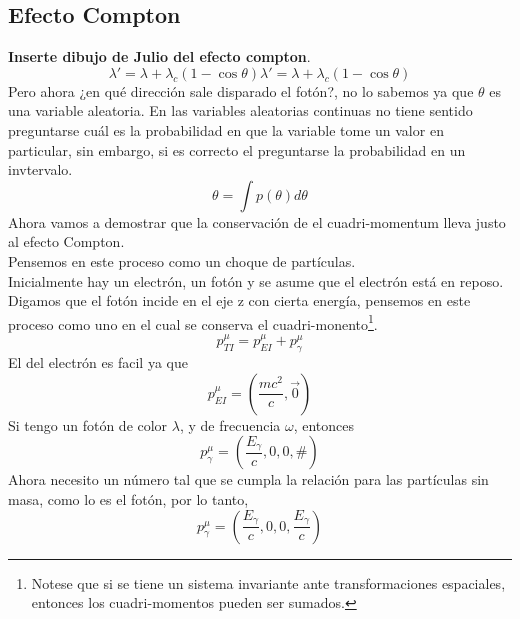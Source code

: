 \documentclass[../main.tex]{subfiles}
\begin{document}
\subsection{Efecto Compton}
\textbf{Inserte dibujo de Julio del efecto compton}.\\
\begin{equation*}
  \lambda ' = \lambda + \lambda_c (1-\cos{\theta})
  \lambda' = \lambda + \lambda_c (1-\cos \theta)
\end{equation*}
Pero ahora ¿en qué dirección sale disparado el fotón?, no lo sabemos ya que $\theta$ es una variable aleatoria. En las variables aleatorias continuas no tiene sentido preguntarse cuál es la probabilidad en que la variable tome un valor en particular, sin embargo, si es correcto el preguntarse la probabilidad en un invtervalo. \\
\begin{equation*}
  \theta=\int p(\theta)d\theta
\end{equation*}
Ahora vamos a demostrar que la conservación de el cuadri-momentum lleva justo al efecto Compton.\\
Pensemos en este proceso como un choque de partículas.\\
Inicialmente hay un electrón, un fotón y se asume que el electrón está en reposo. \\
Digamos que el fotón incide en el eje z con cierta energía, pensemos en este proceso como uno en el cual se conserva el cuadri-monento\footnote{
Notese que si se tiene un sistema invariante ante transformaciones espaciales, entonces los cuadri-momentos pueden ser sumados.}. \\
\begin{equation}
  p^\mu_{TI} = p^\mu_{EI} + p^\mu_\gamma
\end{equation}
El del electrón es facil ya que
\begin{equation*}
  p^\mu_{EI} = \left( \frac{mc^2}{c} , \vec{0} \right)
\end{equation*}
Si tengo un fotón de color $\lambda$, y de frecuencia $\omega$, entonces
\begin{equation*}
  p^\mu_\gamma = \left(\frac{E_\gamma}{c}, 0 , 0 , \# \right)
\end{equation*}
Ahora necesito un número tal que se cumpla la relación para las partículas sin masa, como lo es el fotón, por lo tanto,
\begin{equation*}
  p^\mu_\gamma = \left(\frac{E_\gamma}{c},0,0,\frac{E_\gamma}{c}\right)
\end{equation*}
\end{document}
